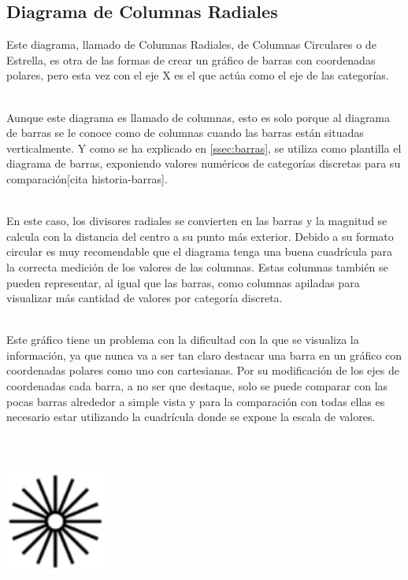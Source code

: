 \documentclass{article}\usepackage[]{graphicx}\usepackage[]{color}
\begin{document}
\subsection{Diagrama de Columnas Radiales} \label{ssec:colRadiales}
Este diagrama, llamado de Columnas Radiales, de Columnas Circulares o de Estrella, es otra de las formas de crear un gr\'afico de barras con coordenadas polares, pero esta vez con el eje X es el que act\'ua como el eje de las categor\'ias.~\\~\par
Aunque este diagrama es llamado de columnas, esto es solo porque al diagrama de barras se le conoce como de columnas cuando las barras est\'an situadas verticalmente. Y como se ha explicado en \ref{ssec:barras}, se utiliza como plantilla el diagrama de barras, exponiendo valores num\'ericos de categor\'ias discretas para su comparaci\'on[cita historia-barras].~\\~\par
En este caso, los divisores radiales se convierten en las barras y la magnitud se calcula con la distancia del centro a su punto m\'as exterior. Debido a su formato circular es muy recomendable que el diagrama tenga una buena cuadr\'icula para la correcta medici\'on de los valores de las columnas. Estas columnas tambi\'en se pueden representar, al igual que las barras, como columnas apiladas para visualizar m\'as cantidad de valores por categor\'ia discreta.~\\~\par
Este gr\'afico tiene un problema con la dificultad con la que se visualiza la informaci\'on, ya que nunca va a ser tan claro destacar una barra en un gr\'afico con coordenadas polares como uno con cartesianas. Por su modificaci\'on de los ejes de coordenadas cada barra, a no ser que destaque, solo se puede comparar con las pocas barras alrededor a simple vista y para la comparaci\'on con todas ellas es necesario estar utilizando la cuadr\'icula donde se expone la escala de valores.
~\\~\\~\\~\\
\vbox{
    \centering
    \includegraphics[width=0.25\textwidth]{imag/columnas}
}
\clearpage
\end{document}

